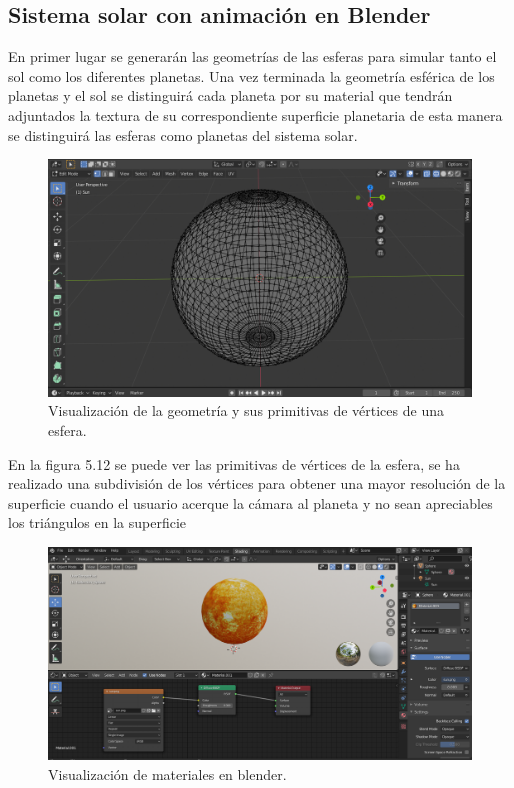 \documentclass[a4paper, 17pt]{book}
\begin{document}
\subsection{Sistema solar con animación en Blender}
\label{subsec:BlenderComp}

En primer lugar se generarán las geometrías de las esferas para simular tanto el sol como los diferentes planetas. Una vez terminada
la geometría esférica de los planetas y el sol se distinguirá cada planeta por su material que tendrán adjuntados la textura de su
correspondiente superficie planetaria de esta manera se distinguirá las esferas como planetas del sistema solar. 

\begin{figure}[hbt!]
    \centering
    \includegraphics[scale=0.25, keepaspectratio]{img/Geometry.png}
    \caption{Visualización de la geometría y sus primitivas de vértices de una esfera.}
    \label{figura:Geometry}
\end{figure}

En la figura 5.12 se puede ver las primitivas de vértices de la esfera, se ha realizado una subdivisión de los vértices para obtener una mayor
resolución de la superficie cuando el usuario acerque la cámara al planeta y no sean apreciables los triángulos en la superficie

\begin{figure}[hbt!]
    \centering
    \includegraphics[scale=0.25, keepaspectratio]{img/MaterialBlender.png}
    \caption{Visualización de materiales en blender.}
    \label{figura:materialesBlender}
\end{figure}
\end{document}
